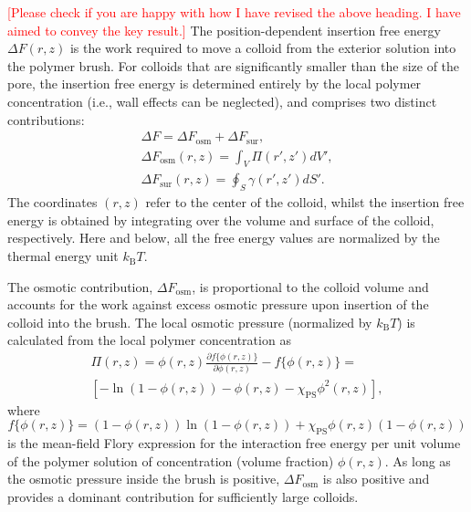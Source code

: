 \documentclass[12pt, a4paper]{article}
\newcommand\todo[1]{\textcolor{red}{#1}}
\begin{document}
\todo{[Please check if you are happy with how I have revised the above heading. I have aimed to convey the key result.]}
The position-dependent insertion free energy $\Delta F(r,z)$ is the work required to move a colloid from the exterior solution into the polymer brush.
For colloids that are significantly smaller than the size of the pore, the insertion free energy is determined entirely by the local polymer concentration (i.e., wall effects can be neglected), and comprises two distinct contributions:
\begin{eqnarray}
    \Delta F = \Delta F_{\text{osm}} + \Delta F_{\text{sur}},
    \label{eq:Delta_F}
    \\
    \Delta F_{\text{osm}}(r,z) = \int_{V} \Pi(r',z') dV', \nonumber
    \\
    \Delta F_{\text{sur}}(r,z) = \oint_{S} \gamma (r',z') dS'. \nonumber
\end{eqnarray}
The coordinates $(r,z)$ refer to the center of the colloid, whilst the insertion free energy is obtained by integrating over the volume and surface of the colloid, respectively.
Here and below, all the free energy values are normalized by the thermal energy unit $k_{\text{B}}T$.

The osmotic contribution, $\Delta F_{\text{osm}}$, is proportional to the colloid volume and accounts for the work against excess osmotic pressure upon insertion of the colloid into the brush.
The local osmotic pressure (normalized by $k_\text{B} T$) is calculated from the local polymer concentration as
\begin{equation}
    \begin{aligned}
        \Pi(r,z)=  \phi(r,z)\frac{\partial f\{\phi(r,z)\}}{\partial \phi(r,z)} - f\{\phi(r,z)\}= 
        \\
        [-\ln(1-\phi(r,z)) - \phi(r,z) -\chi_{\text{PS}}\phi^2(r,z)],
    \end{aligned}
    \label{eq:osmotic}
\end{equation}
where 
$$
f\{\phi(r,z)\}=(1-\phi(r,z))\ln(1-\phi(r,z)) +\chi_{\text{PS}}\phi(r,z)(1-\phi(r,z))
$$
is the mean-field Flory expression for the interaction free energy per unit volume of the polymer solution of concentration (volume fraction) $\phi(r,z)$.
As long as the osmotic pressure inside the brush is positive, $\Delta F_{\text{osm}}$ is also positive and provides a dominant contribution for sufficiently large colloids.
\end{document}
